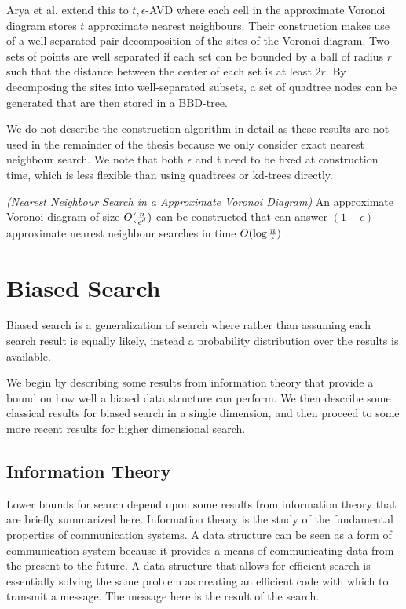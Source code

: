 \documentclass[mcs]{scsthesis}
\begin{document}
Arya et al. \cite{arya-avd} extend this to \(t, \epsilon\)-AVD where each
cell in the approximate Voronoi diagram stores \(t\) approximate nearest
neighbours. Their construction makes use of a well-separated pair
decomposition of the sites of the Voronoi diagram. Two sets of points are well
separated if each set can be bounded by a ball of radius \(r\) such that the
distance between the center of each set is at least \(2r\). By decomposing
the sites into well-separated subsets, a set of quadtree nodes can be
generated that are then stored in a BBD-tree. 

We do not describe the construction algorithm in detail as these results are
not used in the remainder of the thesis because we only consider exact
nearest neighbour search. We note that both \(\epsilon\) and t need to be fixed
at construction time, which is less flexible than using quadtrees or kd-trees
directly.

\begin{thm} \emph{(Nearest Neighbour Search in a Approximate Voronoi Diagram)} 
An approximate Voronoi diagram of size \(O({n \over \epsilon ^ d})\) can be
constructed that can answer \((1 + \epsilon)\) approximate nearest neighbour
searches in time \(O(\log {n \over \epsilon})\) \cite{arya-avd}.
\end{thm}

\section{Biased Search}

Biased search is a generalization of search where rather than assuming each
search result is equally likely, instead a probability distribution over the
results is available.

We begin by describing some results from information theory that provide a
bound on how well a biased data structure can perform. We then describe some
classical results for biased search in a single dimension, and then proceed
to some more recent results for higher dimensional search.

\subsection{Information Theory}

Lower bounds for search depend upon some results from information theory that
are briefly summarized here. Information theory is the study of the fundamental
properties of communication systems. A data structure can be seen as a form of
communication system because it provides a means of communicating data from the
present to the future. A data structure that allows for efficient search is
essentially solving the same problem as creating an efficient code with which
to transmit a message. The message here is the result of the search.
\end{document}
